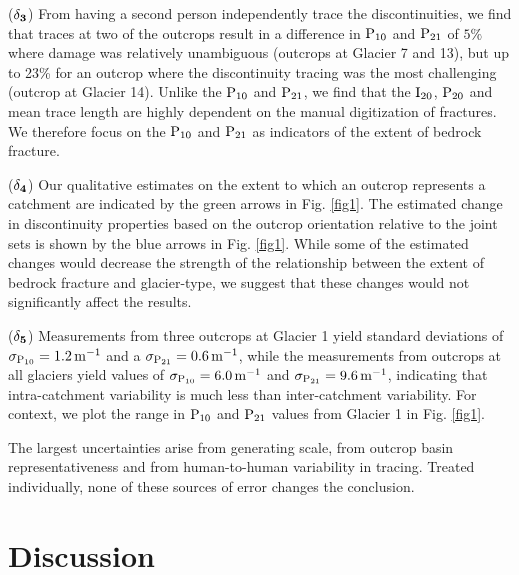 \documentclass[draft,linenumbers]{agujournal}
\begin{document}
($\rm \bf \delta_3$) From having a second person independently trace the discontinuities, we find that traces at two of the outcrops result in a difference in $\rm{P_{10}}$ and $\rm{P_{21}}$ of $5\%$ where damage was relatively unambiguous (outcrops at Glacier 7 and 13), but up to 23\% for an outcrop where the discontinuity tracing was the most challenging (outcrop at Glacier 14). Unlike the $\rm{P_{10}}$ and $\rm{P_{21}}$, we find that the $\rm{I_{20}}$, $\rm{P_{20}}$ and mean trace length are highly dependent on the manual digitization of fractures. We therefore focus on the $\rm{P_{10}}$ and $\rm{P_{21}}$ as indicators of the extent of bedrock fracture. 

($\rm \bf \delta_4$) Our qualitative estimates on the extent to which an outcrop represents a catchment are indicated by the green arrows in Fig. \ref{fig1}. The estimated change in discontinuity properties based on the outcrop orientation relative to the joint sets is shown by the blue arrows in Fig. \ref{fig1}. While some of the estimated changes would decrease the strength of the relationship between the extent of bedrock fracture and glacier-type, we suggest that these changes would not significantly affect the results. 

($\rm \bf \delta_5$) Measurements from three outcrops at Glacier 1 yield standard deviations of $\rm\sigma_{P_{10}} = 1.2\,m^{-1}$ and a $\rm\sigma_{P_{21}} = 0.6\,m^{-1}$, while the measurements from outcrops at all glaciers yield values of $\rm \sigma_{P_{10}} = 6.0\,m^{-1}$ and $\rm \sigma_{P_{21}} = 9.6\,m^{-1}$, indicating that intra-catchment variability is much less than inter-catchment variability. For context, we plot the range in $\rm{P_{10}}$ and $\rm{P_{21}}$ values from Glacier 1 in Fig. \ref{fig1}. 

The largest uncertainties arise from generating scale, from outcrop basin representativeness and from human-to-human variability in tracing. Treated individually, none of these sources of error changes the conclusion. 

\section{Discussion}
\end{document}
